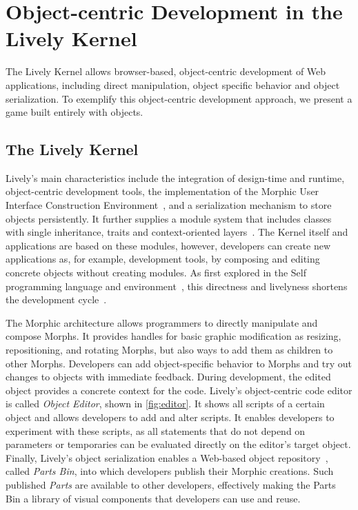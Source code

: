 \section{Object-centric Development in the Lively Kernel} \label{sec:CONTEXT}

The Lively Kernel allows browser-based, object-centric development
of Web applications, including direct manipulation, object specific
behavior and object serialization. To exemplify this object-centric
development approach, we present a game built entirely with objects.

\subsection{The Lively Kernel}

Lively's main characteristics include the integration of design-time
and runtime, object-centric development tools, the implementation of
the Morphic User Interface Construction
Environment~\cite{Maloney1995Mor}, and a serialization mechanism to
store objects persistently. It further supplies a module system that
includes classes with single inheritance, traits and context-oriented
layers~\cite{Lincke2011OIC}. The Kernel itself and applications are
based on these modules, however, developers can create new
applications as, for example, development tools, by composing and
editing concrete objects without creating modules. As first explored
in the Self programming language and environment~\cite{Ungar2007SEL},
this directness and livelyness shortens the development
cycle~\cite{Ungar1987SPS}.

The Morphic architecture allows programmers to directly manipulate and compose Morphs. It provides handles for basic graphic modification as resizing, repositioning, and rotating Morphs, but also ways to add them as children to other Morphs. Developers can add object-specific behavior to Morphs and try out changes to objects with immediate feedback. During development, the edited object provides a concrete context for the code. Lively's object-centric code editor is called \emph{Object Editor}, shown in \autoref{fig:editor}. It shows all scripts of a certain object and allows developers to add and
alter scripts. It enables developers to experiment with these
scripts, as all statements that do not depend on parameters or
temporaries can be evaluated directly on the editor's target
object. Finally, Lively's object serialization enables a Web-based object
repository~\cite{Lincke2012LPC}, called \emph{Parts Bin}, into which
developers publish their Morphic creations. Such published
\emph{Parts} are available to other developers, effectively making the
Parts Bin a library of visual components that developers can use and
reuse.

